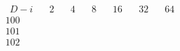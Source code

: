 \documentclass{article}
\begin{document}
{$$\begin{array}{|r|*{6}{r|}}
\hline
\ \ D-i \ \ &\ \ 2\ \ &\ \ 4\ \ &\ \ 8\ \ &\ \ 16\ \ &\ \ 32\ \ &\ \ 64\ \ \\
\hline
100 
 & 
 & 
 & 
 & 
 & 
 & 
\\
\hline
101 
 & 
 & 
 & 
 & 
 & 
 & 
\\
\hline
102 
 & 
 & 
 & 

\end{array}$$}
\end{document}
